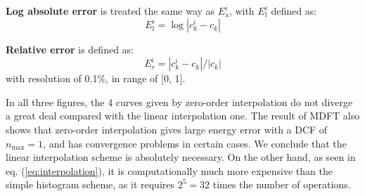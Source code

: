 \textbf{Log absolute error} is treated the same way as $E_{\mathrm{a}}^{i}$,
with $E_{\mathrm{l}}^{i}$ defined as:
\begin{equation}
E_{\mathrm{l}}^{i}=\log\left|c_{k}^{i}-c_{k}\right|
\end{equation}

\textbf{Relative error} is defined as:
\begin{equation}
E_{r}^{i}=\left|c_{k}^{i}-c_{k}\right|/\left|c_{k}\right|\label{eq:Er}
\end{equation}
with resolution of 0.1\%, in range of {[}0, 1{]}.

In all three figures, the 4 curves given by zero-order interpolation
do not diverge a great deal compared with the linear interpolation
one. The result of \acs{MDFT} also shows that zero-order interpolation
gives large energy error with a \acs{DCF} of $n_{\max}=1$, and has
convergence problems in certain cases. We conclude that the linear
interpolation scheme is absolutely necessary. On the other hand, as
seen in eq. (\ref{eq:interpolation}), it is computationally much
more expensive than the simple histogram scheme, as it requires $2^{5}=32$
times the number of operations.
